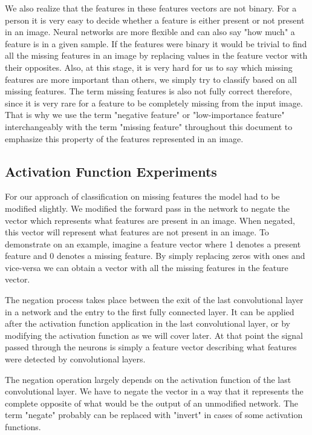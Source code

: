 \documentclass[b5paper]{book}
\begin{document}
We also realize that the features in these features vectors are not binary. For a person it is very easy to decide whether a feature is either present or not present in an image. Neural networks are more flexible and can also say "how much" a feature is in a given sample. If the features were binary it would be trivial to find all the missing features in an image by replacing values in the feature vector with their opposites. Also, at this stage, it is very hard for us to say which missing features are more important than others, we simply try to classify based on all missing features. The term missing features is also not fully correct therefore, since it is very rare for a feature to be completely missing from the input image. That is why we use the term "negative feature" or "low-importance feature" interchangeably with the term "missing feature" throughout this document to emphasize this property of the features represented in an image.

\subsection{Activation Function Experiments}

For our approach of classification on missing features the model had to be modified slightly. We modified the forward pass in the network to negate the vector which represents what features are present in an image. When negated, this vector will represent what features are not present in an image. To demonstrate on an example, imagine a feature vector where 1 denotes a present feature and 0 denotes a missing feature. By simply replacing zeros with ones and vice-versa we can obtain a vector with all the missing features in the feature vector.

The negation process takes place between the exit of the last convolutional layer in a network and the entry to the first fully connected layer. It can be applied after the activation function application in the last convolutional layer, or by modifying the activation function as we will cover later. At that point the signal passed through the neurons is simply a feature vector describing what features were detected by convolutional layers. 

The negation operation largely depends on the activation function of the last convolutional layer. We have to negate the vector in a way that it represents the complete opposite of what would be the output of an unmodified network. The term "negate" probably can be replaced with "invert" in cases of some activation functions. 
\end{document}
